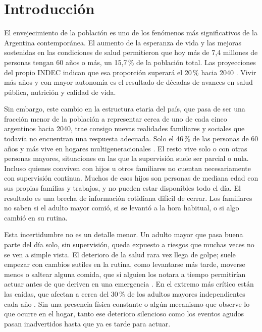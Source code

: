 \chapter{Introducción}

El envejecimiento de la población es uno de los fenómenos más significativos de la Argentina contemporánea.
El aumento de la esperanza de vida y las mejoras sostenidas en las condiciones de salud permitieron que hoy más de 7,4 millones de personas tengan 60 años o más, un 15,7\,\% de la población total.
Las proyecciones del propio INDEC indican que esa proporción superará el 20\,\% hacia 2040 \parencite{INDEC2024}.
Vivir más años y con mayor autonomía es el resultado de décadas de avances en salud pública, nutrición y calidad de vida.

Sin embargo, este cambio en la estructura etaria del país, que pasa de ser una fracción menor de la población a representar cerca de uno de cada cinco argentinos hacia 2040, trae consigo nuevas realidades familiares y sociales que todavía no encuentran una respuesta adecuada.
Solo el 46\,\% de las personas de 60 años y más vive en hogares multigeneracionales \parencite{INDECTablero2024}.
El resto vive solo o con otras personas mayores, situaciones en las que la supervisión suele ser parcial o nula.
Incluso quienes conviven con hijos u otros familiares no cuentan necesariamente con supervisión continua.
Muchos de esos hijos son personas de mediana edad con sus propias familias y trabajos, y no pueden estar disponibles todo el día.
El resultado es una brecha de información cotidiana difícil de cerrar.
Los familiares no saben si el adulto mayor comió, si se levantó a la hora habitual, o si algo cambió en su rutina.

Esta incertidumbre no es un detalle menor.
Un adulto mayor que pasa buena parte del día solo, sin supervisión, queda expuesto a riesgos que muchas veces no se ven a simple vista.
El deterioro de la salud rara vez llega de golpe; suele empezar con cambios sutiles en la rutina, como levantarse más tarde, moverse menos o saltear alguna comida, que si alguien los notara a tiempo permitirían actuar antes de que deriven en una emergencia \parencite{Bierman2001}.
En el extremo más crítico están las caídas, que afectan a cerca del 30\,\% de los adultos mayores independientes cada año \parencite{YeohLui2025}.
Sin una presencia física constante o algún mecanismo que observe lo que ocurre en el hogar, tanto ese deterioro silencioso como los eventos agudos pasan inadvertidos hasta que ya es tarde para actuar.

